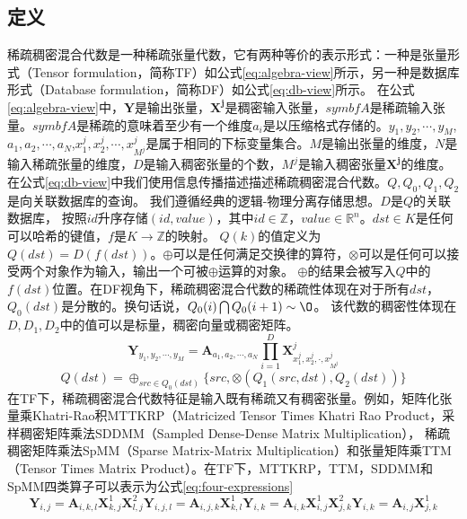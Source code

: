 \subsection{定义}
稀疏稠密混合代数是一种稀疏张量代数，它有两种等价的表示形式：一种是张量形式（Tensor formulation，简称TF）如公式\eqref{eq:algebra-view}所示，另一种是数据库形式（Database formulation，简称DF）如公式\eqref{eq:db-view}所示。
在公式\eqref{eq:algebra-view}中，$\symbf{Y}$是输出张量，$\symbf{X^j}$是稠密输入张量，$symbf{A}$是稀疏输入张量。$symbf{A}$是稀疏的意味着至少有一个维度$a_i$是以压缩格式存储的。$y_1, y_2,\cdots,y_M$,$a_1, a_2,\cdots,a_N$,$x_1^j,x_2^j,\cdots,x_{M^j}^j$是属于相同的下标变量集合。$M$是输出张量的维度，$N$是输入稀疏张量的维度，$D$是输入稠密张量的个数，$M^j$是输入稠密张量$\symbf{X^j}$的维度。
在公式\eqref{eq:db-view}中我们使用信息传播描述描述稀疏稠密混合代数。$Q,Q_0,Q_1,Q_2$是向关联数据库的查询。
我们遵循经典的逻辑-物理分离存储思想\cite{codd1970relational}。$D$是$Q$的关联数据库，
按照$id$升序存储$(id, value)$，其中$id\in \mathbb{Z}$，$value \in \mathbb{R}^n$。$dst\in K$是任何可以哈希的键值，$f$是$K\rightarrow \mathbb{Z}$的映射。
$Q(k)$的值定义为$Q(dst)=D(f(dst))$。$\oplus$可以是任何满足交换律的算符，$\otimes$可以是任何可以接受两个对象作为输入，输出一个可被$\oplus$运算的对象。
$\oplus$的结果会被写入$Q$中的$f(dst)$位置。在DF视角下，稀疏稠密混合代数的稀疏性体现在对于所有$dst$，$Q_0(dst)$是分散的。换句话说，$Q_0(i) \bigcap Q_0(i+1) \sim \O$。
该代数的稠密性体现在$D,D_1,D_2$中的值可以是标量，稠密向量或稠密矩阵。
\begin{equation}
  \symbf{Y}_{y_1, y_2,\cdots,y_M} = \symbf{A}_{a_1, a_2,\cdots,a_N}\prod_{i=1}^{D}\symbf{X}^{j}_{x_1^j,x_2^j,\cdot,x_{M^j}^j}
  \label{eq:algebra-view}
\end{equation}
\begin{equation}
  Q(dst)=\oplus_{src\in Q_0(dst)}\{src, \otimes(Q_1(src,dst), Q_2(dst))\}
  \label{eq:db-view}
\end{equation}
在TF下，稀疏稠密混合代数特征是输入既有稀疏又有稠密张量。例如，矩阵化张量乘Khatri-Rao积MTTKRP（Matricized Tensor Times Khatri Rao Product\cite{nisa2019mttkrp}，采样稠密矩阵乘法SDDMM（Sampled Dense-Dense Matrix Multiplication）\cite{yu2021exploiting}，
稀疏稠密矩阵乘法SpMM（Sparse Matrix-Matrix Multiplication）\cite{huang2020ge}和张量矩阵乘TTM（Tensor Times Matrix Product）\cite{kurt2022ttm}。在TF下，MTTKRP，TTM，SDDMM和SpMM四类算子可以表示为公式\eqref{eq:four-expressions}
\begin{subequations}
  \begin{equation}
      \symbf{Y}_{i,j} = \symbf{A}_{i,k,l}\symbf{X}_{k,j}^1\symbf{X}_{l,j}^2
  \end{equation}
  \begin{equation}
      \symbf{Y}_{i,j,l} = \symbf{A}_{i,j,k}\symbf{X}_{k,l}^1
  \end{equation}
  \begin{equation}
      \symbf{Y}_{i,k} = \symbf{A}_{i,k}\symbf{X}_{i,j}^1\symbf{X}_{j,k}^2
  \end{equation}
  \begin{equation}
      \symbf{Y}_{i,k} = \symbf{A}_{i,j}\symbf{X}_{j,k}^1
  \end{equation}
  \label{eq:four-expressions}
\end{subequations}
